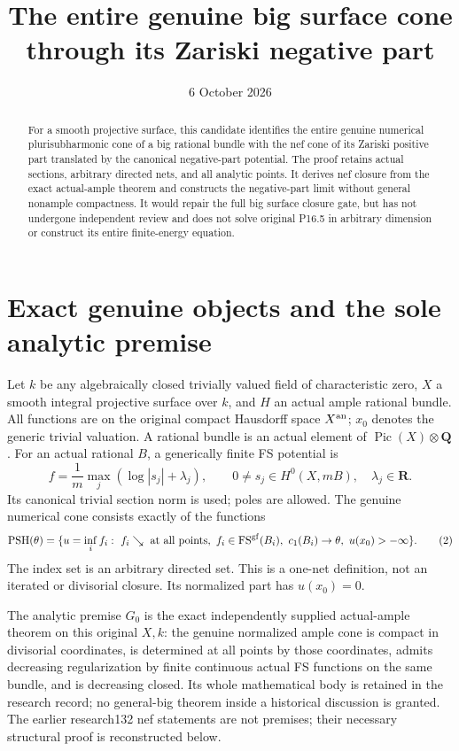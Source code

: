 \documentclass[11pt]{article}
\title{The entire genuine big surface cone through its Zariski negative part}
\author{}
\date{6 October 2026}
\newcommand{\PSH}{\operatorname{PSH}}
\newcommand{\FS}{\operatorname{FS}}
\begin{document}
\maketitle
\begin{abstract}
For a smooth projective surface, this candidate identifies the entire
genuine numerical plurisubharmonic cone of a big rational bundle with
the nef cone of its Zariski positive part translated by the canonical
negative-part potential. The proof retains actual sections, arbitrary
directed nets, and all analytic points. It derives nef closure from the
exact actual-ample theorem and constructs the negative-part limit
without general nonample compactness. It would repair the full big
surface closure gate, but has not undergone independent review and
does not solve original P16.5 in arbitrary dimension or construct its
entire finite-energy equation.
\end{abstract}

\section{Exact genuine objects and the sole analytic premise}
Let $k$ be any algebraically closed trivially valued field of
characteristic zero, $X$ a smooth integral projective surface over $k$,
and $H$ an actual ample rational bundle. All functions are on the
original compact Hausdorff space $X^{\rm an}$; $x_0$ denotes the
generic trivial valuation. A rational bundle is an actual element of
$\operatorname{Pic}(X)\otimes\mathbf Q$.
For an actual rational $B$, a generically finite FS potential is
\[
 f=\frac1m\max_j(\log|s_j|+\lambda_j),\qquad
 0\ne s_j\in H^0(X,mB),\quad\lambda_j\in\mathbf R.
                                                               \tag{1}
\]
Its canonical trivial section norm is used; poles are allowed.
The genuine numerical cone consists exactly of the functions
\[
 \PSH(\theta)=\{u=\inf_i f_i:\ f_i\searrow\text{ at all points},
       \ f_i\in\FS^{\rm gf}(B_i),\ c_1(B_i)\to\theta,
       \ u(x_0)>-\infty\}.                                \tag{2}
\]
The index set is an arbitrary directed set. This is a one-net
definition, not an iterated or divisorial closure. Its normalized
part has $u(x_0)=0$.

The analytic premise $G_0$ is the exact independently supplied
actual-ample theorem on this original $X,k$: the genuine normalized
ample cone is compact in divisorial coordinates, is determined at
all points by those coordinates, admits decreasing regularization
by finite continuous actual FS functions on the same bundle,
and is decreasing closed. Its whole mathematical body is retained
in the research record; no general-big theorem inside a historical
discussion is granted. The earlier research132 nef statements are
not premises; their necessary structural proof is reconstructed below.
\end{document}
